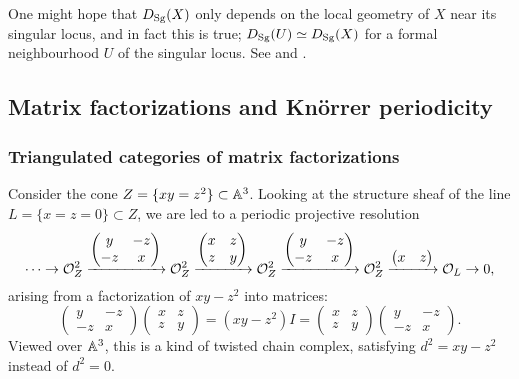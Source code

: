 One might hope that $D_{\mathrm{Sg}}(X)$ only depends on the local geometry of $X$ near
its singular locus, and in fact this is true; $D_{\mathrm{Sg}}(U)\simeq D_{\mathrm{Sg}}(X)$ for a
formal neighbourhood $U$ of the singular locus. See
\cite[Prop~1.14]{OrlovSingularities} and \cite[\S6]{Shipman}.

\subsection{Matrix factorizations and Kn\"orrer periodicity}

\subsubsection{Triangulated categories of matrix factorizations}

Consider the cone $Z=\{xy=z^2\}\subset\mathbb{A}^3$. Looking at the structure sheaf of
the line $L=\{x=z=0\}\subset Z$, we are led to a periodic projective resolution
\begin{equation*}
    \cdots \to
    \mathcal{O}_Z^2 \xrightarrow{\begin{pmatrix}
        y & -z \\ -z & x
    \end{pmatrix}}
    \mathcal{O}_Z^2 \xrightarrow{\begin{pmatrix}
        x & z \\ z & y
    \end{pmatrix}}
    \mathcal{O}_Z^2 \xrightarrow{\begin{pmatrix}
        y & -z \\ -z & x
    \end{pmatrix}}
    \mathcal{O}_Z^2 \xrightarrow{\begin{pmatrix}
        x & z
    \end{pmatrix}}
    \mathcal{O}_L\to0,
\end{equation*}
arising from a factorization of $xy-z^2$ into matrices:
\begin{equation*}
    \begin{pmatrix}
        y & -z \\ -z & x
    \end{pmatrix}
    \begin{pmatrix}
        x & z \\ z & y
    \end{pmatrix}
        = (xy-z^2)I =
    \begin{pmatrix}
        x & z \\ z & y
    \end{pmatrix}
    \begin{pmatrix}
        y & -z \\ -z & x
    \end{pmatrix}.
\end{equation*}
Viewed over $\mathbb{A}^3$, this is a kind of twisted chain complex, satisfying
$d^2=xy-z^2$ instead of $d^2=0$.

